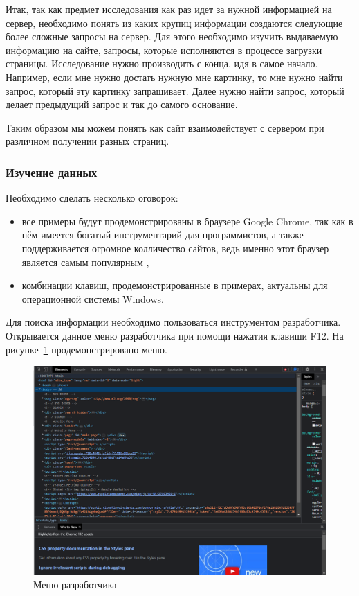 Итак, так как предмет исследования как раз идет за нужной информацией на сервер, 
необходимо понять из каких крупиц информации создаются следующие более сложные запросы на сервер.
Для этого необходимо изучить выдаваемую информацию на сайте, запросы, которые исполняются в процессе загрузки страницы.
Исследование нужно производить с конца, идя в самое начало.
Например, если мне нужно достать нужную мне картинку, то мне нужно найти запрос, который эту картинку запрашивает.
Далее нужно найти запрос, который делает предыдущий запрос и так до самого основание.

Таким образом мы можем понять как сайт взаимодействует с сервером при различном получении разных страниц.

\subsubsection{Изучение данных}
Необходимо сделать несколько оговорок:
\begin{itemize}
    \item все примеры будут продемонстрированы в браузере Google Chrome, так как в нём имеется богатый инструментарий для программистов, а также поддерживается огромное колличество сайтов, ведь именно этот браузер является самым популярным \cite{broser-popularity-cite},
    \item комбинации клавиш, продемонстрированные в примерах, актуальны для операционной системы Windows.
\end{itemize}

Для поиска информации необходимо пользоваться инструментом разработчика. Открывается данное меню разработчика при помощи нажатия клавиши F12. 
На рисунке~\ref{chrome-tools-pic} продемонстрировано меню.

\begin{figure}
    \includegraphics[scale=0.5]{imgs/chrome-tools}
    \caption{Меню разработчика}
    \label{chrome-tools-pic}
\end{figure}

